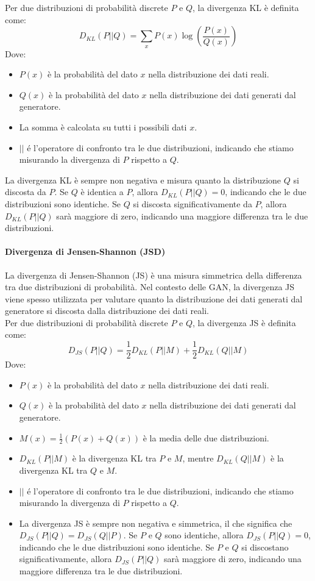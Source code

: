 Per due distribuzioni di probabilità discrete $P$ e $Q$, la divergenza KL è definita come:
$$D_{KL}(P || Q) = \sum_{x} P(x) \log\left(\frac{P(x)}{Q(x)}\right)$$
Dove:
\begin{itemize}
    \item $P(x)$ è la probabilità del dato $x$ nella distribuzione dei dati reali.
    \item $Q(x)$ è la probabilità del dato $x$ nella distribuzione dei dati generati dal generatore.
    \item La somma è calcolata su tutti i possibili dati $x$.
    \item $||$ é l'operatore di confronto tra le due distribuzioni, indicando che stiamo misurando la divergenza di $P$ rispetto a $Q$.
\end{itemize}
La divergenza KL è sempre non negativa e misura quanto la distribuzione $Q$ si discosta da $P$. Se $Q$ è identica a $P$, allora $D_{KL}(P || Q) = 0$, indicando che le due distribuzioni sono identiche. Se $Q$ si discosta significativamente da $P$, allora $D_{KL}(P || Q)$ sarà maggiore di zero, indicando una maggiore differenza tra le due distribuzioni.\\
\paragraph{Divergenza di Jensen-Shannon (JSD)}
La divergenza di Jensen-Shannon (JS) è una misura simmetrica della differenza tra due distribuzioni di probabilità. Nel contesto delle GAN, la divergenza JS viene spesso utilizzata per valutare quanto la distribuzione dei dati generati dal generatore si discosta dalla distribuzione dei dati reali.\\

Per due distribuzioni di probabilità discrete $P$ e $Q$, la divergenza JS è definita come:
$$D_{JS}(P || Q) = \frac{1}{2} D_{KL}(P || M) + \frac{1}{2} D_{KL}(Q || M)$$
Dove:
\begin{itemize}
    \item $P(x)$ è la probabilità del dato $x$ nella distribuzione dei dati reali.
    \item $Q(x)$ è la probabilità del dato $x$ nella distribuzione dei dati generati dal generatore.
    \item $M(x) = \frac{1}{2}(P(x) + Q(x))$ è la media delle due distribuzioni.
    \item $D_{KL}(P || M)$ è la divergenza KL tra $P$ e $M$, mentre $D_{KL}(Q || M)$ è la divergenza KL tra $Q$ e $M$.
    \item $||$ é l'operatore di confronto tra le due distribuzioni, indicando che stiamo misurando la divergenza di $P$ rispetto a $Q$.
    \item La divergenza JS è sempre non negativa e simmetrica, il che significa che $D_{JS}(P || Q) = D_{JS}(Q || P)$. Se $P$ e $Q$ sono identiche, allora $D_{JS}(P || Q) = 0$, indicando che le due distribuzioni sono identiche. Se $P$ e $Q$ si discostano significativamente, allora $D_{JS}(P || Q)$ sarà maggiore di zero, indicando una maggiore differenza tra le due distribuzioni.
\end{itemize}

